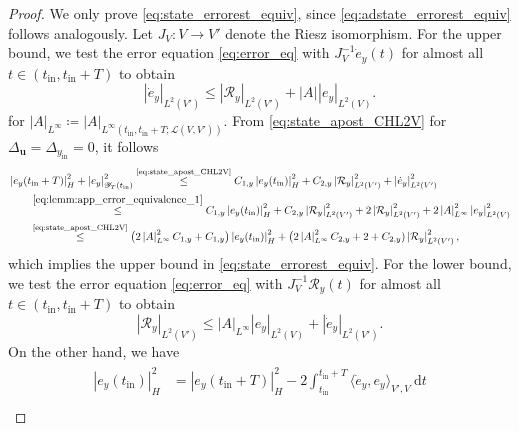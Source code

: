\documentclass{m2an}
\newcommand{\bu}{\mathbf{u}}
\newcommand{\dt}{\mathrm{d}t}
\newcommand{\tint}{t_{\mathrm{in}}}
\newcommand{\yint}{y_{\mathrm{in}}}
\newcommand{\mY}{{\mathscr Y}}
\newcommand{\calL}{\mathcal{L}}
\newcommand{\calR}{\mathcal{R}}
\newcommand{\Res}{\calR}%
\newcommand{\norm}[2]{\left|#1\right|_{#2}}
\begin{document}
\begin{proof}
    We only prove \eqref{eq:state_errorest_equiv}, since \eqref{eq:adstate_errorest_equiv} follows analogously. Let $J_V:V\to V'$ denote the Riesz isomorphism. For the upper bound, we test the error equation \eqref{eq:error_eq} with $J_V^{-1}\dot e_y(t)$ for almost all $t\in (\tint,\tint+T)$ to obtain
    \begin{equation}\label{eq:lemm:app_error_equivalence_1}
        \norm{\dot e_y}{L^2(V')}\leq \norm{\Res_y}{L^2(V')}+\norm{A}{}\norm{e_y}{L^2(V)}.
    \end{equation}
    for $\norm{A}{L^\infty}\coloneqq \norm{A}{L^\infty(\tint,\tint+T;\calL(V,V'))}$.
    From \eqref{eq:state_apost_CHL2V} for $\Delta_\bu=\Delta_{\yint}=0$, it follows
    \begin{align*}
        &\norm{e_y(\tint+T)}{H}^2+ \norm{e_y}{\mY_T(\tint)}^2 \stackrel{\text{\eqref{eq:state_apost_CHL2V}}}{\leq} C_{1,y}\norm{e_y(\tint)}{H}^2+C_{2,y}\norm{\Res_y}{L^2(V')}^2+\norm{\dot e_y}{L^2(V')}^2\\
        & \qquad\stackrel{\eqref{eq:lemm:app_error_equivalence_1}}{\leq}  C_{1,y}\norm{e_y(\tint)}{H}^2+C_{2,y}\norm{\Res_y}{L^2(V')}^2+ 2\norm{\Res_y}{L^2(V')}^2+2\norm{A}{L^\infty}^2\norm{e_y}{L^2(V)}^2\\
        &\qquad\stackrel{\text{\eqref{eq:state_apost_CHL2V}}}{\leq} \big(2\norm{A}{L^\infty}^2C_{1,y}+C_{1,y}\big)\norm{e_y(\tint)}{H}^2+ \big(2\norm{A}{L^\infty}^2C_{2,y}+2+C_{2,y})\norm{\Res_y}{L^2(V')}^2,
    \end{align*}
    which implies the upper bound in \eqref{eq:state_errorest_equiv}. For the lower bound, we test the error equation \eqref{eq:error_eq} with $J_V^{-1}\Res_y(t)$ for almost all $t\in (\tint,\tint+T)$ to obtain
    \begin{equation}\label{eq:lemm:app_error_equivalence_2}
        \norm{\Res_y}{L^2(V')}\leq \norm{A}{L^\infty} \norm{e_y}{L^2(V)}+\norm{\dot e_y}{L^2(V')}.
    \end{equation}
    On the other hand, we have
    \begin{align}
       \label{eq:lemm:app_error_equivalence_3}
        \begin{aligned}
            \norm{e_y(\tint)}{H}^2&=\norm{e_y(\tint+T)}{H}^2-2\int_{\tint}^{\tint+T}\langle \dot e_y, e_y\rangle_{V',V}\ \dt\\

\end{aligned}
\end{align}
\end{proof}
\end{document}
